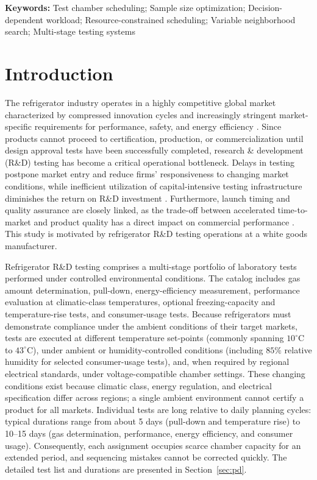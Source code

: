 \documentclass[11pt]{article}
\begin{document}
\textbf{Keywords:} Test chamber scheduling; Sample size optimization; Decision-dependent workload;
Resource-constrained scheduling; Variable neighborhood search;
Multi-stage testing systems

\section{Introduction}
\label{sec:intro}

The refrigerator industry operates in a highly competitive global market characterized by compressed innovation cycles and increasingly stringent market-specific requirements for performance, safety, and energy efficiency \citep{IEA2021,IEC60335-1,IEC60335-2-24,IEC62552}. Since products cannot proceed to certification, production, or commercialization until design approval tests have been successfully completed, research \& development (R\&D) testing has become a critical operational bottleneck. Delays in testing postpone market entry and reduce firms' responsiveness to changing market conditions, while inefficient utilization of capital-intensive testing infrastructure diminishes the return on R\&D investment \citep{OECD_MSTI2024,OECD_MSTI2025}. Furthermore, launch timing and quality assurance are closely linked, as the trade-off between accelerated time-to-market and product quality has a direct impact on commercial performance \citep{KimKoenigsbergOfek2022}. This study is motivated by refrigerator R\&D testing operations at a white goods manufacturer.

Refrigerator R\&D testing comprises a multi-stage portfolio of laboratory tests performed under controlled environmental conditions. The catalog includes gas amount determination, pull-down, energy-efficiency measurement, performance evaluation at climatic-class temperatures, optional freezing-capacity and temperature-rise tests, and consumer-usage tests. Because refrigerators must demonstrate compliance under the ambient conditions of their target markets, tests are executed at different temperature set-points (commonly spanning \(10^\circ\mathrm{C}\) to \(43^\circ\mathrm{C}\)), under ambient or humidity-controlled conditions (including \(85\%\) relative humidity for selected consumer-usage tests), and, when required by regional electrical standards, under voltage-compatible chamber settings. These changing conditions exist because climatic class, energy regulation, and electrical specification differ across regions; a single ambient environment cannot certify a product for all markets. Individual tests are long relative to daily planning cycles: typical durations range from about 5 days (pull-down and temperature rise) to 10--15 days (gas determination, performance, energy efficiency, and consumer usage). Consequently, each assignment occupies scarce chamber capacity for an extended period, and sequencing mistakes cannot be corrected quickly. The detailed test list and durations are presented in Section~\ref{sec:pd}.
\end{document}
